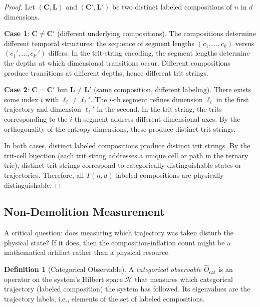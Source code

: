\documentclass[twocolumn,10pt,a4paper]{article}
\theoremstyle{definition}
\newtheorem{definition}[theorem]{Definition}
\theoremstyle{remark}
\newcommand{\Hilbert}{\mathcal{H}}
\newcommand{\Ocat}{\hat{O}_{\mathrm{cat}}}
\begin{document}
\begin{proof}
Let $(\mathbf{C}, \mathbf{L})$ and $(\mathbf{C}', \mathbf{L}')$ be two distinct labeled compositions of $n$ in $d$ dimensions.

\textbf{Case 1}: $\mathbf{C} \neq \mathbf{C}'$ (different underlying compositions). The compositions determine different temporal structures: the sequence of segment lengths $(c_1, \ldots, c_k)$ versus $(c_1', \ldots, c_{k'}')$ differs. In the trit-string encoding, the segment lengths determine the depths at which dimensional transitions occur. Different compositions produce transitions at different depths, hence different trit strings.

\textbf{Case 2}: $\mathbf{C} = \mathbf{C}'$ but $\mathbf{L} \neq \mathbf{L}'$ (same composition, different labeling). There exists some index $i$ with $\ell_i \neq \ell_i'$. The $i$-th segment refines dimension $\ell_i$ in the first trajectory and dimension $\ell_i'$ in the second. In the trit string, the trits corresponding to the $i$-th segment address different dimensional axes. By the orthogonality of the entropy dimensions, these produce distinct trit strings.

In both cases, distinct labeled compositions produce distinct trit strings. By the trit-cell bijection (each trit string addresses a unique cell or path in the ternary trie), distinct trit strings correspond to categorically distinguishable states or trajectories. Therefore, all $T(n,d)$ labeled compositions are physically distinguishable.
\end{proof}

\subsection{Non-Demolition Measurement}

A critical question: does measuring which trajectory was taken disturb the physical state? If it does, then the composition-inflation count might be a mathematical artifact rather than a physical resource.

\begin{definition}[Categorical Observable]
\label{def:cat_obs}
A \emph{categorical observable} $\Ocat$ is an operator on the system's Hilbert space $\Hilbert$ that measures which categorical trajectory (labeled composition) the system has followed. Its eigenvalues are the trajectory labels, i.e., elements of the set of labeled compositions.
\end{definition}
\end{document}
